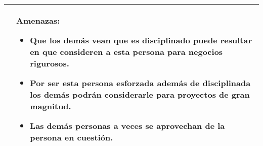 \documentclass{article}
\begin{document}
\begin{center}
\begin{tabular}{ | p{8.5cm} | p{8.5cm} | }
            & Amenazas: 
                \begin{itemize}
                    \item Que los demás vean que es disciplinado puede resultar en que consideren a esta persona para negocios rigurosos.
                    \item Por ser esta persona esforzada además de disciplinada los demás podrán considerarle para proyectos de gran magnitud.
                    \item Las demás personas a veces se aprovechan de la persona en cuestión.
                \end{itemize}
            \\ 
        \hline
   \end{tabular}
\end{center}
\end{document}
